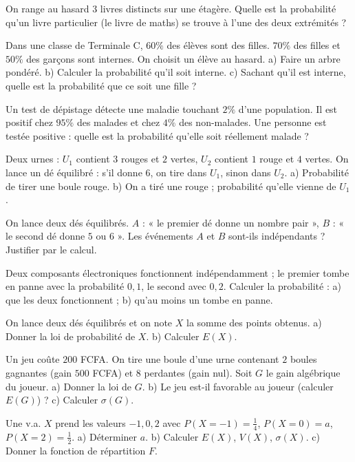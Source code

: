 \exo{} On range au hasard $3$ livres distincts sur une étagère. Quelle est
la probabilité qu'un livre particulier (le livre de maths) se trouve à l'une des
deux extrémités ?

\exo{} Dans une classe de Terminale C, $60\%$ des élèves sont des filles.
$70\%$ des filles et $50\%$ des garçons sont internes. On choisit un élève au
hasard. a) Faire un arbre pondéré. b) Calculer la probabilité qu'il soit interne.
c) Sachant qu'il est interne, quelle est la probabilité que ce soit une fille ?

\exo{} Un test de dépistage détecte une maladie touchant $2\%$ d'une
population. Il est positif chez $95\%$ des malades et chez $4\%$ des non-malades.
Une personne est testée positive : quelle est la probabilité qu'elle soit
réellement malade ?

\exo{} Deux urnes : $U_1$ contient $3$ rouges et $2$ vertes, $U_2$
contient $1$ rouge et $4$ vertes. On lance un dé équilibré : s'il donne $6$, on
tire dans $U_1$, sinon dans $U_2$. a) Probabilité de tirer une boule rouge.
b) On a tiré une rouge ; probabilité qu'elle vienne de $U_1$.

\exo{} On lance deux dés équilibrés. $A$ : « le premier dé donne un nombre
pair », $B$ : « le second dé donne $5$ ou $6$ ». Les événements $A$ et $B$ sont-ils
indépendants ? Justifier par le calcul.

\exo{} Deux composants électroniques fonctionnent indépendamment ; le
premier tombe en panne avec la probabilité $0{,}1$, le second avec $0{,}2$.
Calculer la probabilité : a) que les deux fonctionnent ; b) qu'au moins un tombe
en panne.

\exo{} On lance deux dés équilibrés et on note $X$ la somme des points
obtenus. a) Donner la loi de probabilité de $X$. b) Calculer $E(X)$.

\exo{} Un jeu coûte $200$ FCFA. On tire une boule d'une urne contenant
$2$ boules gagnantes (gain $500$ FCFA) et $8$ perdantes (gain nul). Soit $G$ le
gain algébrique du joueur. a) Donner la loi de $G$. b) Le jeu est-il favorable au
joueur (calculer $E(G)$) ? c) Calculer $\sigma(G)$.

\exo{} Une v.a. $X$ prend les valeurs $-1,0,2$ avec
$P(X{=}-1)=\frac14$, $P(X{=}0)=a$, $P(X{=}2)=\frac12$. a) Déterminer $a$.
b) Calculer $E(X)$, $V(X)$, $\sigma(X)$. c) Donner la fonction de répartition $F$.

